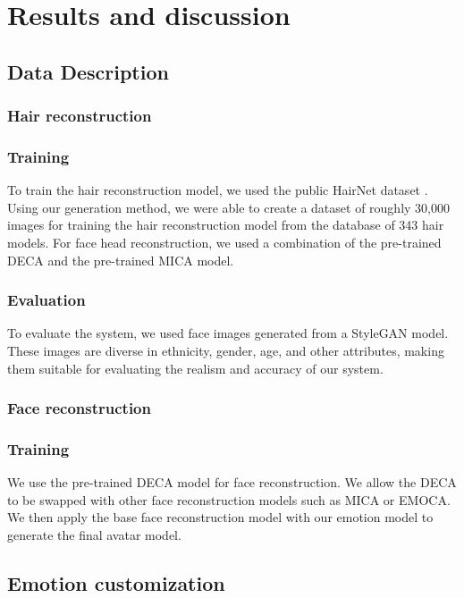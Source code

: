 \section{Results and discussion}
\label{sec:results}

\subsection{Data Description}
\subsubsection{Hair reconstruction}
\subsubsection{Training}
To train the hair reconstruction model, we used the public HairNet dataset \cite{zhouHairNetSingleViewHair2018}. Using our generation method, we were able to create a dataset of roughly 30,000 images for training the hair reconstruction model from the database of 343 hair models.
For face head reconstruction, we used a combination of the pre-trained DECA \cite{fengLearningAnimatableDetailed2021} and the pre-trained MICA \cite{zielonkaMetricalReconstructionHuman2022} model.
\subsubsection{Evaluation}
To evaluate the system, we used face images generated from a StyleGAN \cite{karrasStyleBasedGeneratorArchitecture2019} model. These images are diverse in ethnicity, gender, age, and other attributes, making them suitable for evaluating the realism and accuracy of our system.
\subsubsection{Face reconstruction}
\subsubsection{Training}
We use the pre-trained DECA model for face reconstruction. We allow the DECA to be swapped with other face reconstruction models such as MICA \cite{zielonkaMetricalReconstructionHuman2022} or EMOCA. We then apply the base face reconstruction model with our emotion model to generate the final avatar model.

\subsection{Emotion customization}
